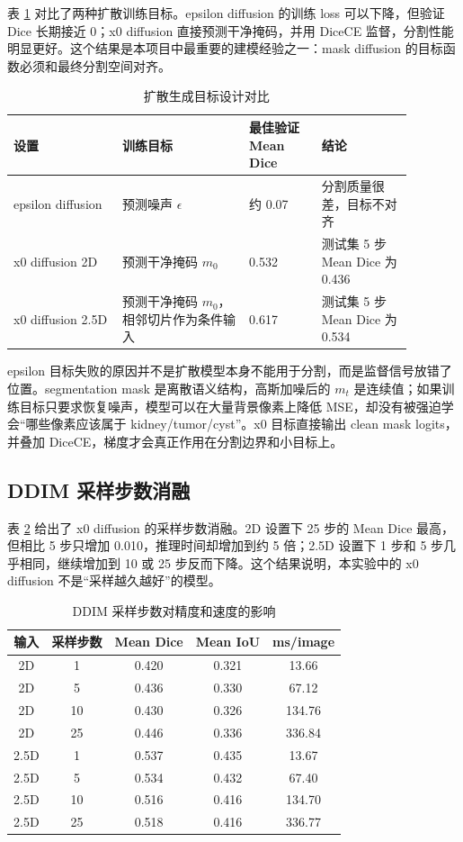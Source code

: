 \documentclass[lang=cn,11pt,a4paper]{elegantpaper}
\begin{document}
表 \ref{tab:diffusion_objective} 对比了两种扩散训练目标。epsilon diffusion 的训练 loss 可以下降，但验证 Dice 长期接近 0；x0 diffusion 直接预测干净掩码，并用 DiceCE 监督，分割性能明显更好。这个结果是本项目中最重要的建模经验之一：mask diffusion 的目标函数必须和最终分割空间对齐。

\begin{table}[H]
\centering
\caption{扩散生成目标设计对比}
\label{tab:diffusion_objective}
\begin{tabular}{p{0.24\linewidth}p{0.28\linewidth}p{0.16\linewidth}p{0.20\linewidth}}
\toprule
设置 & 训练目标 & 最佳验证 Mean Dice & 结论 \\
\midrule
epsilon diffusion & 预测噪声 $\epsilon$ & 约 0.07 & 分割质量很差，目标不对齐 \\
x0 diffusion 2D & 预测干净掩码 $m_0$ & 0.532 & 测试集 5 步 Mean Dice 为 0.436 \\
x0 diffusion 2.5D & 预测干净掩码 $m_0$，相邻切片作为条件输入 & 0.617 & 测试集 5 步 Mean Dice 为 0.534 \\
\bottomrule
\end{tabular}
\end{table}

epsilon 目标失败的原因并不是扩散模型本身不能用于分割，而是监督信号放错了位置。segmentation mask 是离散语义结构，高斯加噪后的 $m_t$ 是连续值；如果训练目标只要求恢复噪声，模型可以在大量背景像素上降低 MSE，却没有被强迫学会“哪些像素应该属于 kidney/tumor/cyst”。x0 目标直接输出 clean mask logits，并叠加 DiceCE，梯度才会真正作用在分割边界和小目标上。

\subsection{DDIM 采样步数消融}

表 \ref{tab:sampling_steps} 给出了 x0 diffusion 的采样步数消融。2D 设置下 25 步的 Mean Dice 最高，但相比 5 步只增加 0.010，推理时间却增加到约 5 倍；2.5D 设置下 1 步和 5 步几乎相同，继续增加到 10 或 25 步反而下降。这个结果说明，本实验中的 x0 diffusion 不是“采样越久越好”的模型。

\begin{table}[H]
\centering
\caption{DDIM 采样步数对精度和速度的影响}
\label{tab:sampling_steps}
\begin{tabular}{ccccc}
\toprule
输入 & 采样步数 & Mean Dice & Mean IoU & ms/image \\
\midrule
2D & 1 & 0.420 & 0.321 & 13.66 \\
2D & 5 & 0.436 & 0.330 & 67.12 \\
2D & 10 & 0.430 & 0.326 & 134.76 \\
2D & 25 & 0.446 & 0.336 & 336.84 \\
2.5D & 1 & 0.537 & 0.435 & 13.67 \\
2.5D & 5 & 0.534 & 0.432 & 67.40 \\
2.5D & 10 & 0.516 & 0.416 & 134.70 \\
2.5D & 25 & 0.518 & 0.416 & 336.77 \\
\bottomrule
\end{tabular}
\end{table}
\end{document}
